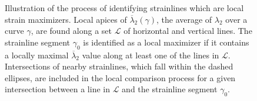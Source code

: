 \begin{figure}[htpb]
    \centering
    \def\svgwidth{0.8\linewidth}
    
    \caption[Illustration of the process of identifying strainlines which
    are local strain maximizers]{Illustration of the process of identifying
        strainlines which are local strain maximizers.
        Local apices of $\overline{\lambda}_{2}(\gamma)$, the average of
        $\lambda_{2}$ over a curve $\gamma$, are found along a set $\mathcal{L}$
        of horizontal and vertical lines. The strainline segment
    $\gamma_{0}$ is identified as a local maximizer if it contains a locally
maximal $\overline{\lambda}_{2}$ value along at least one of the lines in
$\mathcal{L}$. Intersections of nearby strainlines, which fall within the dashed
ellipses, are included in the local comparison process for a given intersection
between a line in $\mathcal{L}$ and the strainline segment $\gamma_{0}$.}
    \label{fig:neighborlcs}
\end{figure}
